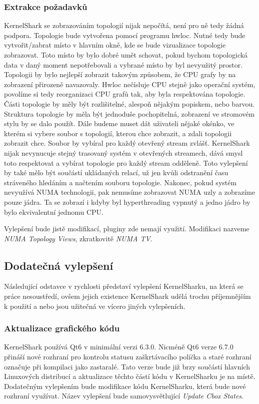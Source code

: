 \subsubsection*{Extrakce požadavků}
KernelShark se zobrazováním topologií nijak nepočítá, není pro ně tedy žádná podpora. Topologie bude vytvořena pomocí programu hwloc. Nutné tedy bude vytvořit/zabrat místo v hlavním okně, kde se bude vizualizace topologie zobrazovat. Toto místo by bylo dobré umět schovat, pokud bychom topologická data v daný moment nepotřebovali a vybrané místo by byl nevyužitý prostor. Topologii by bylo nejlepší zobrazit takovým způsobem, že CPU grafy by na zobrazení přirozeně navazovaly. Hwloc nečísluje CPU stejně jako operační systém, povolíme si tedy reorganizaci CPU grafů tak, aby byla respektována topologie. Části topologie by měly být rozlišitelné, alespoň nějakým popiskem, nebo barvou. Struktura topologie by měla být jednoduše pochopitelná, zobrazení ve stromovém stylu by se dalo použít. Dále budeme muset dát uživateli nějaké okénko, ve kterém si vybere soubor s topologií, kterou chce zobrazit, a zdali topologii zobrazit chce. Soubor by vybíral pro každý otevřený stream zvlášť. KernelShark nijak nevynucuje stejný trasovaný systém v otevřených streamech, dává smysl toto respektovat a vybírat topologie pro každý stream odděleně. Toto vylepšení by také mělo být součástí ukládaných relací, už jen kvůli odstranění času stráveného hledáním a načtením souboru topologie. Nakonec, pokud systém nevyužívá NUMA technologii, pak nemusíme zobrazovat NUMA uzly a zobrazíme pouze jádra. Ta se zobrazí i kdyby byl hyperthreading vypnutý a jedno jádro by bylo ekvivalentní jednomu CPU.

Vylepšení bude jistě modifikací, pluginy zde nemají využití. Modifikaci nazveme \emph{NUMA Topology Views}, zkratkovitě \emph{NUMA TV}.

\subsection{Dodatečná vylepšení}

Následující odstavce v rychlosti představí vylepšení KernelSharku, na která se práce nesoustředí, ovšem jejich existence KernelShark udělá trochu příjemnějším k použití a nebo jsou užitečná ve vícero jiných vylepšeních.

\subsubsection*{Aktualizace grafického kódu}
KernelShark používá Qt6 v minimální verzi 6.3.0. Nicméně Qt6 verze 6.7.0 přináší nové rozhraní pro kontrolu statusu zaškrtávacího políčka a staré rozhraní označuje při kompilaci jako zastaralé. Tato verze bude již brzy součástí hlavních Linuxových distribucí a aktualizace těchto částí kódu v KernelSharku je na místě. Dodatečným vylepšením bude modifikace kódu KernelSharku, která bude nové rozhraní využívat. Název vylepšení bude samovysvětlující \emph{Update Cbox States}.

